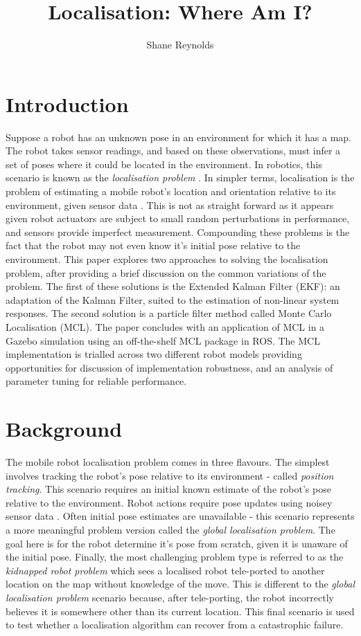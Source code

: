 \documentclass[a4paper]{article}
\begin{document}
\title{Localisation: Where Am I?}
\author{Shane Reynolds}
\maketitle
\tableofcontents
\newpage
\section{Introduction}
Suppose a robot has an unknown pose in an environment for which it has a map. The robot takes sensor readings, and based on these observations, must infer a set of poses where it could be located in the environment. In robotics, this scenario is known as the \textit{localisation problem} \cite{Cox:1991, Wang:1988}. In simpler terms, localisation is the problem of estimating a mobile robot's location and orientation relative to its environment, given sensor data \cite{Thrun:2001}. This is not as straight forward as it appears given robot actuators are subject to small random perturbations in performance, and sensors provide imperfect measurement. Compounding these problems is the fact that the robot may not even know it's initial pose relative to the environment. This paper explores two approaches to solving the localisation problem, after providing a brief discussion on the common variations of the problem. The first of these solutions is the Extended Kalman Filter (EKF): an adaptation of the Kalman Filter, suited to the estimation of non-linear system responses. The second solution is a particle filter method called Monte Carlo Localisation (MCL). The paper concludes with an application of MCL in a Gazebo simulation using an off-the-shelf MCL package in ROS. The MCL implementation is trialled across two different robot models providing opportunities for discussion of implementation robustness, and an analysis of parameter tuning for reliable performance.

\section{Background}
The mobile robot localisation problem comes in three flavours. The simplest involves tracking the robot's pose relative to its environment - called \textit{position tracking}. This scenario requires an initial known estimate of the robot's pose relative to the environment. Robot actions require pose updates using noisey sensor data \cite{Thrun:1999}. Often initial pose estimates are unavailable - this scenario represents a more meaningful problem version called the \textit{global localisation problem}. The goal here is for the robot determine it's pose from scratch, given it is unaware of the initial pose. Finally, the most challenging problem type is referred to as the \textit{kidnapped robot problem} which sees a localised robot tele-ported to another location on the map without knowledge of the move. This is different to the \textit{global localisation problem} scenario because, after tele-porting, the robot incorrectly believes it is somewhere other than its current location. This final scenario is used to test whether a localisation algorithm can recover from a catastrophic failure.
\end{document}
